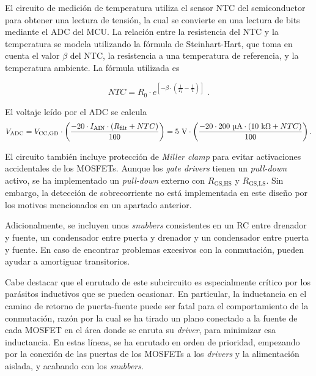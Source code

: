 El circuito de medición de temperatura utiliza el sensor NTC del semiconductor para obtener una lectura de tensión, la cual se convierte en una lectura de bits mediante el ADC del MCU. La relación entre la resistencia del NTC y la temperatura se modela utilizando la fórmula de Steinhart-Hart, que toma en cuenta el valor $\beta$ del NTC, la resistencia a una temperatura de referencia, y la temperatura ambiente. La fórmula utilizada es

\[
NTC = R_0 \cdot e^{\left[-\beta \cdot \left(\frac{1}{T_0} - \frac{1}{\text{T}}\right)\right]} \text{ .}
\]

El voltaje leído por el ADC se calcula
\[
V_{\text{ADC}} = V_{\text{CC,GD}} \cdot \left(\frac{-20 \cdot I_{\text{AIN}} \cdot (R_{\text{filt}} + NTC)}{100}\right) = 5 \text{ V} \cdot \left(\frac{-20 \cdot 200 \text{ }\text{\unit{\micro\ampere}} \cdot (10 \text{ k}\Omega + NTC)}{100}\right) \text{.}
\]

El circuito también incluye protección de \textit{Miller clamp} para evitar activaciones accidentales de los MOSFETs. Aunque los \textit{gate drivers} tienen un \textit{pull-down} activo, se ha implementado un \textit{pull-down} externo con $R_{\text{GS,HS}}$ y $R_{\text{GS,LS}}$. Sin embargo, la detección de sobrecorriente no está implementada en este diseño por los motivos mencionados en un apartado anterior.

Adicionalmente, se incluyen unos \textit{snubbers} consistentes en un RC entre drenador y fuente, un condensador entre puerta y drenador y un condensador entre puerta y fuente. En caso de encontrar problemas excesivos con la conmutación, pueden ayudar a amortiguar transitorios.

Cabe destacar que el enrutado de este subcircuito es especialmente crítico por los parásitos inductivos que se pueden ocasionar. En particular, la inductancia en el camino de retorno de puerta-fuente puede ser fatal para el comportamiento de la conmutación, razón por la cual se ha tirado un plano conectado a la fuente de cada MOSFET en el área donde se enruta su \textit{driver}, para minimizar esa inductancia. En estas líneas, se ha enrutado en orden de prioridad, empezando por la conexión de las puertas de los MOSFETs a los \textit{drivers} y la alimentación aislada, y acabando con los \textit{snubbers}.


